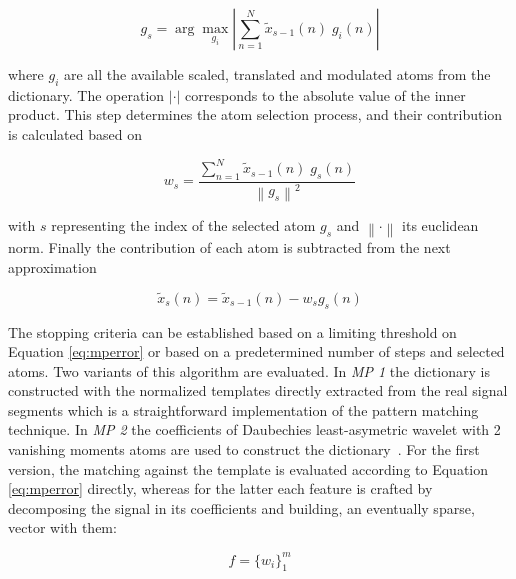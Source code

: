 \begin{equation}
g_{s} = \arg \max_{g_{i}} \left\lvert  \sum_{n=1}^{N} \tilde{x}_{s-1}(n) \; g_{i}(n) \right\rvert 
\label{eq:mp3}
\end{equation}

\noindent where $g_{i}$ are all the available scaled, translated and modulated atoms from the dictionary.  The operation $\left\lvert \cdot \right\rvert$ corresponds to the absolute value of the inner product.  This step determines the atom selection process, and their contribution is calculated based on 



\begin{equation}
w_{s} =  \frac{\sum_{n=1}^{N} \tilde{x}_{s-1}(n) \; g_{s}(n)}{  {\left\lVert  g_{s} \right\rVert}^{2} }
\label{eq:mp4}
\end{equation}

\noindent with $s$ representing the index of the selected atom $g_{s}$ and $\left\lVert \cdot \right\rVert$ its euclidean norm.  Finally the contribution of each atom is subtracted from the next approximation~\cite{Cohen2014,Sanei2007, Mallat1993}

\begin{equation}
\tilde{x}_{s}(n)=  \tilde{x}_{s-1}(n) - w_{s} g_{s} (n)
\label{eq:mp5}
\end{equation}

The stopping criteria can be established based on a limiting threshold on Equation \ref{eq:mperror} or based on a predetermined number of steps and selected atoms.  Two variants of this algorithm are evaluated. In \textit{MP 1} the dictionary is constructed with the normalized templates directly extracted from the real signal segments which is a straightforward implementation of the pattern matching technique.  In \textit{MP 2} the coefficients of Daubechies least-asymetric wavelet with 2 vanishing moments atoms are used to construct the dictionary~\cite{Vareka2012}.  For the first version, the matching against the template is evaluated according to Equation \ref{eq:mperror} directly, whereas for the latter each feature is crafted by decomposing the signal in its coefficients and building, an eventually sparse, vector with them:

\begin{equation}
f =  {\bigg \{ w_{i} \bigg \}}_{1}^{m} 
\label{eq:mp6}
\end{equation}

